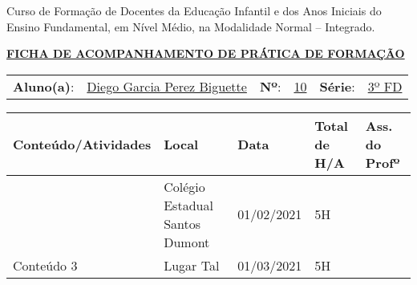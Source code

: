 \documentclass{SchoolBook}
\newcommand{\addline}[4]{
    \hline
    #1 & #2 & #3 & #4 &  \\
}
\newcommand{\addtitle}[5]{
    \hline
    \bf\centering#1 & \bf\centering#2 & \bf#3 & \bf#4 & \bf#5 \\
}
\newcommand{\namebar}[3]{
    \begin{tabular}{ L{1.3cm} L{7cm} L{0.2cm} C{0.7cm} L{0.7cm} L{4cm} }
        \textbf{Aluno(a)}: & \uline{      #1\hfill} &
        \textbf{Nº}:       & \uline{\hfill#2\hfill} &
        \textbf{Série}:    & \uline{      #3\hfill}
    \end{tabular}
}
\newenvironment{chtable}{
    \begin{center}
        \begin{tabular}{ | L{7cm} | L{3cm} | C{2.3cm} | C{1.5cm} | C{2cm} | }
}{
        \hline
        \end{tabular}
    \end{center}
}
\begin{document}
    \centering
    Curso de Formação de Docentes da Educação Infantil e dos Anos Iniciais do Ensino Fundamental, em Nível Médio, na Modalidade Normal -- Integrado.\vspace{6pt}
    
    \underline{\bf
        FICHA DE ACOMPANHAMENTO DE PRÁTICA DE FORMAÇÃO
    }\vspace{12pt}
    
    \namebar{Diego Garcia Perez Biguette}{10}{3º FD}
    \vspace{-6pt}
    \begin{chtable}
        \addtitle{Conteúdo/Atividades}{Local}{Data}{Total de H/A}{Ass. do Profº}
        \addline{\lipsum[1][1-1]}{Colégio Estadual Santos Dumont}{01/02/2021}{5H}
        \addline{Conteúdo 3}{Lugar Tal}{01/03/2021}{5H}
    \end{chtable}
\end{document}
